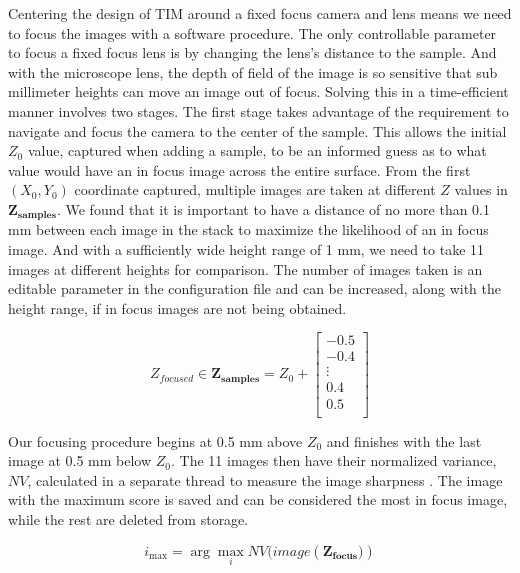 \documentclass[a4paper,12pt]{article}
\begin{document}
Centering the design of TIM around a fixed focus camera and lens means we need to focus the images with a software procedure.
The only controllable parameter to focus a fixed focus lens is by changing the lens's distance to the sample. 
And with the microscope lens, the depth of field of the image is so sensitive that sub millimeter heights can move an image out of focus.
Solving this in a time-efficient manner involves two stages. 
The first stage takes advantage of the requirement to navigate and focus the camera to the center of the sample.
This allows the initial $Z_0$ value, captured when adding a sample, to be an informed guess as to what value would have an in focus image across the entire surface. 
From the first $(X_0, Y_0)$ coordinate captured, multiple images are taken at different $Z$ values in $\boldsymbol{Z_{\text{samples}}}$. 
We found that it is important to have a distance of no more than 0.1 mm between each image in the stack to maximize the likelihood of an in focus image.
And with a sufficiently wide height range of 1 mm, we need to take  11 images at different heights for comparison. The number of images taken is an editable parameter in the configuration file and can be increased, along with the height range, if in focus images are not being obtained.

\[
Z_{focused} \in
\boldsymbol{Z_{\text{samples}}} = 
Z_0 + 
\begin{bmatrix}
-0.5 \\
-0.4 \\
\vdots \\
0.4 \\
0.5 \\
\end{bmatrix}
\] %

Our focusing procedure begins at 0.5 mm above $Z_0$ and finishes with the last image at 0.5 mm below $Z_0$.
The 11 images then have their normalized variance, $NV$, calculated in a separate thread to measure the image sharpness \citep{sampat_extensive_2014}.
The image with the maximum score is saved and can be considered the most in focus image, while the rest are deleted from storage.

\[
  i_{\max} = \arg\max_{i} NV(image(\boldsymbol{{Z_\text{focus}})})
  \]
\end{document}
